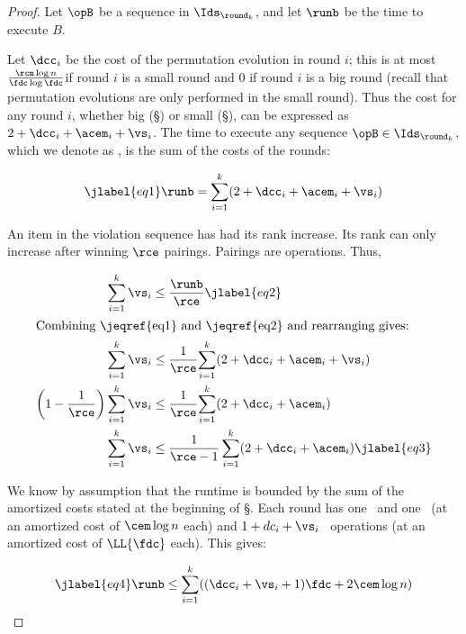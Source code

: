 \begin{fullonly}

\begin{proof}
Let $\opB$ be a sequence in $\Ids_{\round_k}$, and let $\runb$ be the time to execute $B$.

Let $\dcc_i$ be the cost of the permutation evolution in round $i$; this is at most $ \frac{\rcm \log n}{\fdc \log \fdc}$if round $i$ is a small round and 0 if round $i$ is a big round (recall that permutation evolutions are only performed in the small round).
Thus the cost for any round $i$, whether big (\S{}) or small (\S{}), can be expressed as $2+\dcc_i +    \acem_i +  \vs_i$.
The time to execute any sequence $\opB \in \Ids_{\round_k}$, which we denote as \runb, is the sum of the costs of the rounds:

\begin{equation} \jlabel{eq1}
 \runb =  \sum_{i=1}^k (2+\dcc_i +    \acem_i +  \vs_i) 
 \end{equation}
 


An item in the violation sequence has had its rank increase. Its rank can only increase after winning $\rce$ pairings. Pairings are operations. Thus,



\begin{align}
 \sum_{i=1}^k \vs_i 
 &\leq \frac{\runb}{\rce }  \jlabel{eq2}
\\
\intertext{Combining~\jeqref{eq1} and~\jeqref{eq2} and rearranging gives:}
\sum_{i=1}^k \vs_i &\leq \frac{1}{\rce}{\sum_{i=1}^k (2+\dcc_i +    \acem_i +  \vs_i)}
\nonumber
\\
\left(1-\frac{1}{\rce} \right)
\sum_{i=1}^k \vs_i &\leq \frac{1}{\rce}{\sum_{i=1}^k (2+\dcc_i +    \acem_i )}
\nonumber
\\
\sum_{i=1}^k \vs_i &\leq  \frac{1}{\rce -1}\sum_{i=1}^k (2+\dcc_i +   \acem_i )
\jlabel{eq3}
\end{align}



We know by assumption that the runtime is bounded by the sum of the amortized costs stated at the beginning of \S{}. Each round has one \opIns\ and one \opEm\ (at an amortized cost of $\cem \log n$ each) and $1+dc_i + \vs_i$ \opDc\ operations (at an amortized cost of $\LL{\fdc}$ each). This gives:

\begin{equation} \jlabel{eq4}
\runb\leq \sum_{i=1}^k (  (\dcc_i + \vs_i +1 ) {\fdc}  + 2 \cem \log n )
\end{equation}






\end{proof}
\end{fullonly}

